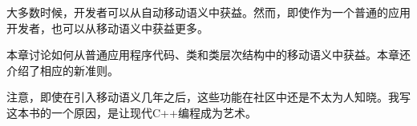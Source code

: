 大多数时候，开发者可以从自动移动语义中获益。然而，即使作为一个普通的应用开发者，也可以从移动语义中获益更多。

本章讨论如何从普通应用程序代码、类和类层次结构中的移动语义中获益。本章还介绍了相应的新准则。

注意，即使在引入移动语义几年之后，这些功能在社区中还是不太为人知晓。我写这本书的一个原因，是让现代C++编程成为艺术。